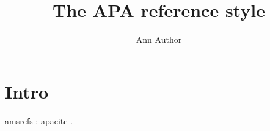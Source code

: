 \documentclass[APA]{WileyNJD-v1}
\begin{document}
\title{The APA reference style}
\author{Ann Author}
\maketitle
\section{Intro}
amsrefs ; apacite .
\end{document}
